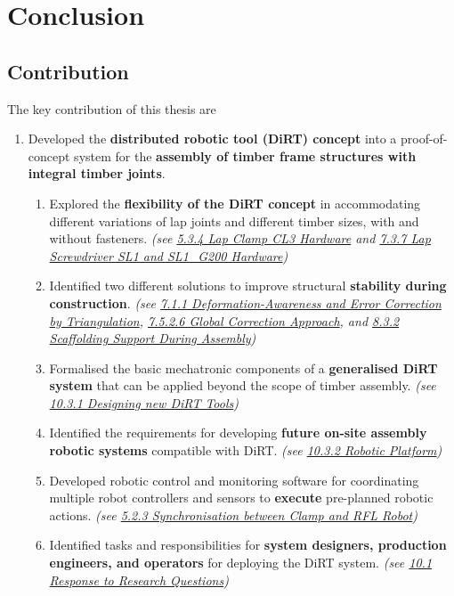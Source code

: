 \documentclass[11pt]{book}
\begin{document}
\section{Conclusion}

\subsection{Contribution}

The key contribution of this thesis are

\begin{enumerate}
	\item Developed the \textbf{distributed robotic tool (DiRT) concept} into a proof-of-concept system for the \textbf{assembly of timber frame structures with integral timber joints}. 

\begin{enumerate}
	\item Explored the \textbf{flexibility of the DiRT concept} in accommodating different variations of lap joints and different timber sizes, with and without fasteners. \textit{(see \uline{5.3.4 Lap Clamp CL3 Hardware} and \uline{7.3.7 Lap Screwdriver SL1 and SL1\_G200 Hardware})}

	\item Identified two different solutions to improve structural \textbf{stability during construction}. \textit{(see \uline{7.1.1 Deformation-Awareness and Error Correction by Triangulation}, \uline{7.5.2.6 Global Correction Approach}, and \uline{8.3.2 Scaffolding Support During Assembly})}

	\item Formalised the basic mechatronic components of a \textbf{generalised DiRT system} that can be applied beyond the scope of timber assembly. \textit{(see \uline{10.3.1 Designing new DiRT Tools})}

	\item Identified the requirements for developing \textbf{future on-site assembly robotic systems} compatible with DiRT.  \textit{(see \uline{10.3.2 Robotic Platform})}

	\item Developed robotic control and monitoring software for coordinating multiple robot controllers and sensors to \textbf{execute} pre-planned robotic actions. \textit{(see \uline{5.2.3 Synchronisation between Clamp and RFL Robot})}

	\item Identified tasks and responsibilities for\textbf{ system designers, production engineers, and operators} for deploying the DiRT system. \textit{(see \uline{10.1 Response to Research Questions})}


\end{enumerate}
\end{enumerate}
\end{document}
